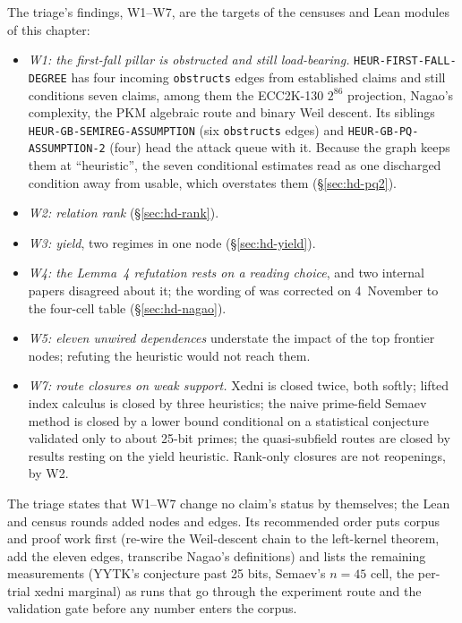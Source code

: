 The triage's findings, W1--W7, are the targets of the censuses and Lean
modules of this chapter:
\begin{itemize}
\item \emph{W1: the first-fall pillar is obstructed and still load-bearing.}
  \texttt{HEUR-FIRST-FALL-DEGREE} has four incoming \texttt{obstructs} edges
  from established claims and still conditions seven claims, among them the
  ECC2K-130 $2^{86}$ projection, Nagao's complexity, the PKM algebraic route
  and binary Weil descent. Its siblings \texttt{HEUR-GB-SEMIREG-ASSUMPTION}
  (six \texttt{obstructs} edges) and \texttt{HEUR-GB-PQ-ASSUMPTION-2} (four)
  head the attack queue with it. Because the graph keeps them at
  ``heuristic'', the seven conditional estimates read as one discharged
  condition away from usable, which overstates them
  (\S\ref{sec:hd-pq2}).
\item \emph{W2: relation rank} (\S\ref{sec:hd-rank}).
\item \emph{W3: yield}, two regimes in one node (\S\ref{sec:hd-yield}).
\item \emph{W4: the Lemma~4 refutation rests on a reading choice}, and two
  internal papers disagreed about it; the wording of
   was corrected on 4~November to the
  four-cell table (\S\ref{sec:hd-nagao}).
\item \emph{W5: eleven unwired dependences} understate the impact of the top
  frontier nodes; refuting the heuristic would not reach them.
\item \emph{W7: route closures on weak support.} Xedni is closed twice, both
  softly; lifted index calculus is closed by three heuristics; the naive
  prime-field Semaev method is closed by a lower bound conditional on a
  statistical conjecture validated only to about 25-bit primes; the
  quasi-subfield routes are closed by results resting on the yield
  heuristic. Rank-only closures are not reopenings, by W2.
\end{itemize}
The triage states that W1--W7 change no claim's status by themselves; the
Lean and census rounds added nodes and edges. Its recommended order puts
corpus and proof work first (re-wire the Weil-descent chain to the
left-kernel theorem, add the eleven edges, transcribe Nagao's definitions)
and lists the remaining measurements (YYTK's conjecture past 25 bits,
Semaev's $n=45$ cell, the per-trial xedni marginal) as runs that go through
the experiment route and the validation gate before any number enters the
corpus.

